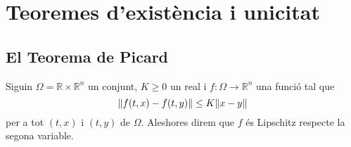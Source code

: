 \documentclass[../Apunts.tex]{subfiles}
\begin{document}
	\section{Teoremes d'existència i unicitat}
	\subsection{El Teorema de Picard}
	\begin{definition}
		\label{def:funció Lipschitz respecte la segona variable}
		Siguin \(\Omega=\mathbb{R}\times\mathbb{R}^{n}\) un conjunt, \(K\geq0\) un real i \(f\colon\Omega\longrightarrow\mathbb{R}^{n}\) una funció tal que
		\[\norm{f(t,x)-f(t,y)}\leq K\norm{x-y}\]
		per a tot \((t,x)\) i \((t,y)\) de \(\Omega\). Aleshores direm que \(f\) és Lipschitz respecte la segona variable.
	\end{definition}
\end{document}
